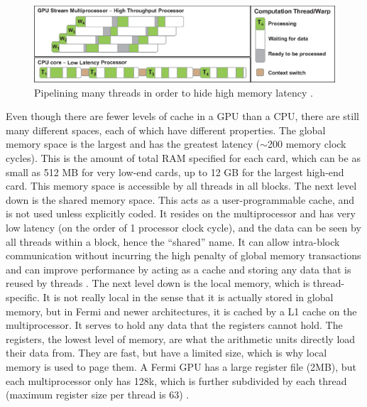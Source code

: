 \begin{figure}[h!] 
  \centering
    \includegraphics[width=\textwidth]{graphics/pipeline.eps}
     \caption[Pipelining many threads in order to hide high memory latency.]{Pipelining many threads in order to hide high memory latency \cite{cuda_gtc_pres}. \label{pipeline}}
\end{figure}

Even though there are fewer levels of cache in a GPU than a CPU, there are still many different spaces, each of which have different properties.  The global memory space is the largest and has the greatest latency ($\sim$200 memory clock cycles).  This is the amount of total RAM specified for each card, which can be as small as 512 MB for very low-end cards, up to 12 GB for the largest high-end card.  This memory space is accessible by all threads in all blocks.  The next level down is the shared memory space.  This acts as a user-programmable cache, and is not used unless explicitly coded.  It resides on the multiprocessor and has very low latency (on the order of 1 processor clock cycle), and the data can be seen by all threads within a block, hence the ``shared'' name.  It can allow intra-block communication  without incurring the high penalty of global memory transactions and can improve performance by acting as a cache and storing any data that is reused by threads \cite{cuda}.  The next level down is the local memory, which is thread-specific.  It is not really local in the sense that it is actually stored in global memory, but in Fermi and newer architectures, it is cached by a  L1 cache on the multiprocessor.  It serves to hold any data that the registers cannot hold.  The registers, the lowest level of memory, are what the arithmetic units directly load their data from.  They are fast, but have a limited size, which is why local memory is used to page them.  A Fermi GPU  has a large register file (2MB), but each multiprocessor only has 128k, which is further subdivided by each thread (maximum register size per thread is 63) \cite{fermi}.

